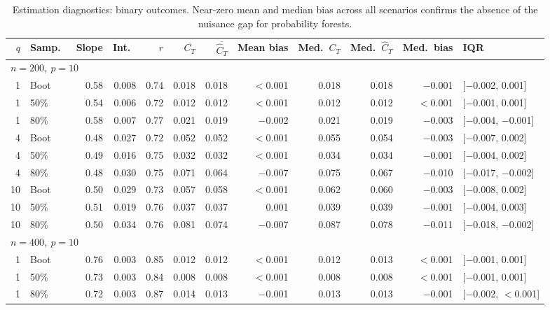 \documentclass[11pt]{article}
\theoremstyle{plain}
\theoremstyle{definition}
\theoremstyle{remark}
\begin{document}
\begin{table}[htbp!]
	\centering
	\footnotesize
	\caption{Estimation diagnostics: binary outcomes. Near-zero mean and median bias across all scenarios confirms the absence of the nuisance gap for probability forests.}
	\label{tab:binary}
	\begin{tabular}{rlrrrrrrrrrl}
		\hline
		$q$ & Samp.\ & Slope & Int.\ & $r$ & $\overline{C_T}$ & $\overline{\widehat C_T}$ & Mean bias & Med.\ $C_T$ & Med.\ $\widehat C_T$ & Med.\ bias & IQR \\
		\hline
		\multicolumn{12}{l}{\textit{$n = 200$, $p = 10$}} \\[2pt]
		1  & Boot & 0.58 & 0.008 & 0.74 & 0.018 & 0.018 & $<$0.001  & 0.018 & 0.018 & $-$0.001 & [$-$0.002, 0.001] \\
		1  & 50\% & 0.54 & 0.006 & 0.72 & 0.012 & 0.012 & $<$0.001  & 0.012 & 0.012 & $<$0.001 & [$-$0.001, 0.001] \\
		1  & 80\% & 0.58 & 0.007 & 0.77 & 0.021 & 0.019 & $-$0.002  & 0.021 & 0.019 & $-$0.003 & [$-$0.004, $-$0.001] \\
		4  & Boot & 0.48 & 0.027 & 0.72 & 0.052 & 0.052 & $<$0.001  & 0.055 & 0.054 & $-$0.003 & [$-$0.007, 0.002] \\
		4  & 50\% & 0.49 & 0.016 & 0.75 & 0.032 & 0.032 & $<$0.001  & 0.034 & 0.034 & $-$0.001 & [$-$0.004, 0.002] \\
		4  & 80\% & 0.48 & 0.030 & 0.75 & 0.071 & 0.064 & $-$0.007  & 0.075 & 0.067 & $-$0.010 & [$-$0.017, $-$0.002] \\
		10 & Boot & 0.50 & 0.029 & 0.73 & 0.057 & 0.058 & $<$0.001  & 0.062 & 0.060 & $-$0.003 & [$-$0.008, 0.002] \\
		10 & 50\% & 0.51 & 0.019 & 0.76 & 0.037 & 0.037 & 0.001     & 0.039 & 0.039 & $-$0.001 & [$-$0.004, 0.003] \\
		10 & 80\% & 0.50 & 0.034 & 0.76 & 0.081 & 0.074 & $-$0.007  & 0.087 & 0.078 & $-$0.011 & [$-$0.018, $-$0.002] \\[4pt]
		\multicolumn{12}{l}{\textit{$n = 400$, $p = 10$}} \\[2pt]
		1  & Boot & 0.76 & 0.003 & 0.85 & 0.012 & 0.012 & $<$0.001  & 0.012 & 0.013 & $<$0.001 & [$-$0.001, 0.001] \\
		1  & 50\% & 0.73 & 0.003 & 0.84 & 0.008 & 0.008 & $<$0.001  & 0.008 & 0.008 & $<$0.001 & [$-$0.001, 0.001] \\
		1  & 80\% & 0.72 & 0.003 & 0.87 & 0.014 & 0.013 & $-$0.001  & 0.013 & 0.013 & $-$0.001 & [$-$0.002, $<$0.001] \\

\end{tabular}
\end{table}
\end{document}
